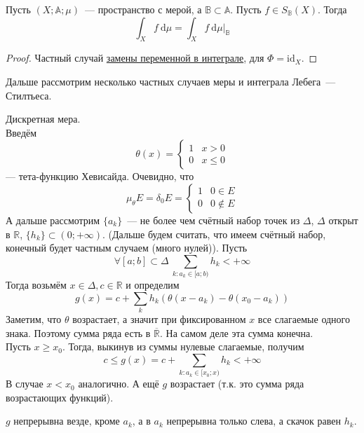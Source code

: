 \documentclass{article}
\begin{document}
    \begin{claim}
        Пусть $(X;\mathbb A;\mu)$~--- пространство с мерой, а $\mathbb B\subset\mathbb A$. Пусть $f\in S_{\mathbb B}(X)$. Тогда
        $$
        \int_Xf~\mathrm d\mu=\int_Xf~\mathrm d\mu\big|_{\mathbb B}
        $$
    \end{claim}
    \begin{proof}
        Частный случай \hyperref[Общая схема замены переменной в интеграле]{замены переменной в интеграле}, для $\Phi=\mathrm{id}_X$.
    \end{proof}
    \begin{remark}
        Дальше рассмотрим несколько частных случаев меры и интеграла Лебега~--- Стилтьеса.
    \end{remark}
    \begin{example}
        Дискретная мера.\\
        Введём
        $$\theta(x)=\begin{cases}
            1 & x>0\\0 & x\leqslant 0
        \end{cases}$$
        --- тета-функцию Хевисайда. Очевидно, что
        $$\mu_\theta E=\delta_0E=\begin{cases}
            1 & 0\in E\\
            0 & 0\notin E
        \end{cases}$$
        А дальше рассмотрим $\{a_k\}$~--- не более чем счётный набор точек из $\Delta$, $\Delta$ открыт в $\mathbb R$, $\{h_k\}\subset(0;+\infty)$. (Дальше будем считать, что имеем счётный набор, конечный будет частным случаем (много нулей)). Пусть
        $$
        \forall [a;b]\subset\Delta~\sum\limits_{k:a_k\in[a;b)}h_k<+\infty
        $$
        Тогда возьмём $x\in\Delta,c\in\mathbb R$ и определим
        $$
        g(x)=c+\sum\limits_kh_k(\theta(x-a_k)-\theta(x_0-a_k))
        $$
        Заметим, что $\theta$ возрастает, а значит при фиксированном $x$ все слагаемые одного знака. Поэтому сумма ряда есть в $\overline{\mathbb R}$. На самом деле эта сумма конечна.\\
        Пусть $x\geqslant x_0$. Тогда, выкинув из суммы нулевые слагаемые, получим
        $$
        c\leqslant g(x)=c+\sum\limits_{k:a_k\in[x_0;x)}h_k<+\infty
        $$
        В случае $x<x_0$ аналогично. А ещё $g$ возрастает (т.к. это сумма ряда возрастающих функций).
        \begin{claim}
            $g$ непрерывна везде, кроме $a_k$, а в $a_k$ непрерывна только слева, а скачок равен $h_k$.
        \end{claim}

\end{example}
\end{document}
